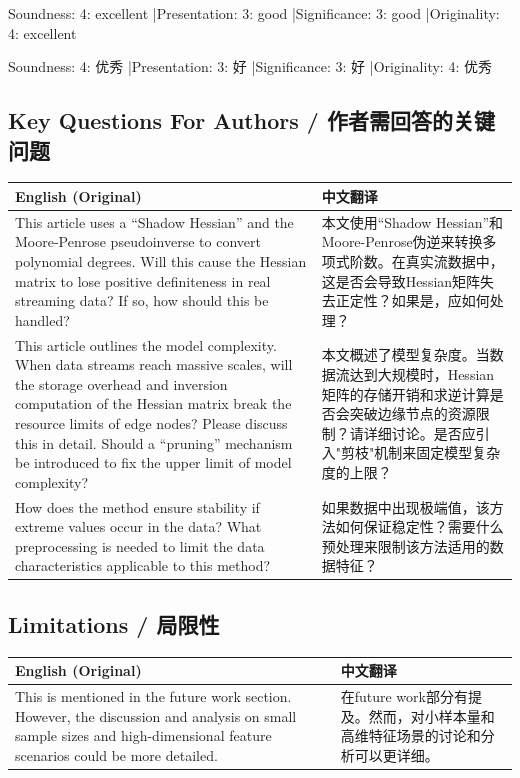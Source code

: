\documentclass[10pt,a4paper]{article}
\begin{document}
\noindent Soundness: 4: excellent \quad|\quad Presentation: 3: good \quad|\quad Significance: 3: good \quad|\quad Originality: 4: excellent

\noindent Soundness: 4: 优秀 \quad|\quad Presentation: 3: 好 \quad|\quad Significance: 3: 好 \quad|\quad Originality: 4: 优秀

\subsection{Key Questions For Authors / 作者需回答的关键问题}

\begin{longtable}{L{0.48\textwidth}|L{0.48\textwidth}}
\hline
\textbf{English (Original)} & \textbf{中文翻译} \\
\hline
This article uses a ``Shadow Hessian'' and the Moore-Penrose pseudoinverse to convert polynomial degrees. Will this cause the Hessian matrix to lose positive definiteness in real streaming data? If so, how should this be handled?
&
本文使用``Shadow Hessian''和Moore-Penrose伪逆来转换多项式阶数。在真实流数据中，这是否会导致Hessian矩阵失去正定性？如果是，应如何处理？ \\
\hline
This article outlines the model complexity. When data streams reach massive scales, will the storage overhead and inversion computation of the Hessian matrix break the resource limits of edge nodes? Please discuss this in detail. Should a ``pruning'' mechanism be introduced to fix the upper limit of model complexity?
&
本文概述了模型复杂度。当数据流达到大规模时，Hessian矩阵的存储开销和求逆计算是否会突破边缘节点的资源限制？请详细讨论。是否应引入"剪枝"机制来固定模型复杂度的上限？ \\
\hline
How does the method ensure stability if extreme values occur in the data? What preprocessing is needed to limit the data characteristics applicable to this method?
&
如果数据中出现极端值，该方法如何保证稳定性？需要什么预处理来限制该方法适用的数据特征？ \\
\hline
\end{longtable}

\subsection{Limitations / 局限性}

\begin{longtable}{L{0.48\textwidth}|L{0.48\textwidth}}
\hline
\textbf{English (Original)} & \textbf{中文翻译} \\
\hline
This is mentioned in the future work section. However, the discussion and analysis on small sample sizes and high-dimensional feature scenarios could be more detailed.
&
在future work部分有提及。然而，对小样本量和高维特征场景的讨论和分析可以更详细。 \\
\hline
\end{longtable}
\end{document}
